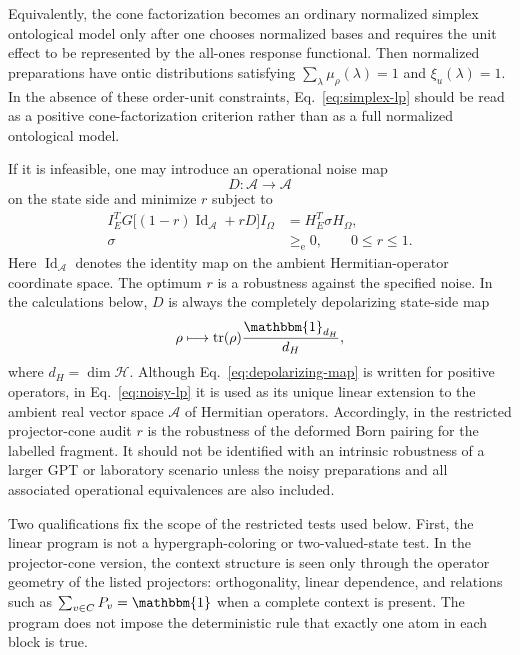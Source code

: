 \documentclass[aps,pra,twocolumn,superscriptaddress,nofootinbib]{revtex4-2}
\newcommand{\HH}{\mathcal{H}}
\newcommand{\tr}{\operatorname{tr}}
\newcommand{\id}{\mathbbm{1}}
\begin{document}
Equivalently, the cone factorization becomes an ordinary normalized simplex
ontological model only after one chooses normalized bases and requires the
unit effect to be represented by the all-ones response functional.  Then
normalized preparations have ontic distributions satisfying
\(\sum_\lambda\mu_\rho(\lambda)=1\) and
\(\xi_u(\lambda)=1\).  In the absence of these order-unit constraints,
Eq.~\eqref{eq:simplex-lp} should be read as a positive cone-factorization
criterion rather than as a full normalized ontological model.

If it is infeasible, one may
introduce an operational noise map
\begin{equation}
        D:\mathcal A\to\mathcal A
\end{equation}
on the state side and minimize $r$ subject to
\begin{equation}
        \begin{aligned}
        I_E^T G\bigl[(1-r)\operatorname{Id}_{\mathcal A}+rD\bigr]I_\Omega
        &= H_E^T\sigma H_\Omega,\\
        \sigma&\ge_{\mathrm e}0,\qquad 0\le r\le1.
        \end{aligned}
        \label{eq:noisy-lp}
\end{equation}
Here $\operatorname{Id}_{\mathcal A}$ denotes the identity map on the ambient
Hermitian-operator coordinate space.  The optimum $r$ is a robustness against
the specified noise.  In the calculations below, $D$ is always the completely
depolarizing state-side map
\begin{equation}
        \rho\longmapsto \tr(\rho)\frac{\id_{d_H}}{d_H},
        \label{eq:depolarizing-map}
\end{equation}
where $d_H=\dim\HH$.  Although Eq.~\eqref{eq:depolarizing-map} is written for positive operators, in Eq.~\eqref{eq:noisy-lp} it is used as its unique linear extension to the ambient real vector space $\mathcal A$ of Hermitian operators.  Accordingly, in the restricted projector-cone audit \(r\) is the robustness of the deformed Born pairing for the labelled fragment.  It should not be identified with an intrinsic robustness of a larger GPT or laboratory scenario unless the noisy preparations and all associated operational equivalences are also included.

Two qualifications fix the scope of the restricted tests used below.
First, the linear program is not a hypergraph-coloring or two-valued-state test.
In the projector-cone version, the context structure is seen only through the
operator geometry of the listed projectors: orthogonality, linear dependence,
and relations such as \(\sum_{v\in C}P_v=\id\) when a complete context is
present.  The program does not impose the deterministic rule that exactly one
atom in each block is true.
\end{document}
